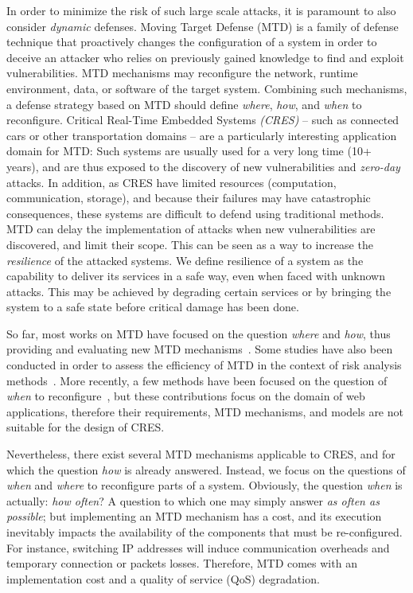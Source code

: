 In order to minimize the risk of such large scale attacks, it is paramount to also consider \emph{dynamic} defenses. Moving Target Defense (MTD) is a family of defense technique that proactively changes the configuration of a system in order to deceive an attacker who relies on previously gained knowledge to find and exploit vulnerabilities. MTD mechanisms may reconfigure the network, runtime environment, data, or software of the target system. Combining such mechanisms, a defense strategy based on MTD should define \emph{where}, \emph{how}, and \emph{when} to reconfigure. Critical Real-Time Embedded Systems \emph{(CRES)} -- such as connected cars or other transportation domains -- are a particularly interesting application domain for MTD: Such systems are usually used for a very long time (10+ years), and are thus exposed to the discovery of new vulnerabilities and \emph{zero-day} attacks. In addition, as CRES have limited resources (computation, communication, storage), and because their failures may have catastrophic consequences, these systems are difficult to defend using traditional methods. MTD can delay the implementation of attacks when new vulnerabilities are discovered, and limit their scope. This can be seen as a way to increase the \emph{resilience} of the attacked systems. We define resilience of a system as the capability to deliver its services in a safe way, even when faced with unknown attacks. This may be achieved by degrading certain services or by bringing the system to a safe state before critical damage has been done.   

So far, most works on MTD have focused on the question \emph{where} and \emph{how}, thus providing and evaluating new MTD mechanisms~\cite{xu_2014, taylor_automated_2016}.
Some studies have also been conducted in order to assess the efficiency of MTD in the context of risk analysis methods~\cite{hong_assessing_2016}. More recently, a few methods have been focused on the question of \emph{when} to reconfigure~\cite{lei_optimal_2017,sengupta_game_2017, feng_stackelberg_2017, li_optimal_2019, Zhang_Strat_2019}, but these contributions focus on the domain of web applications, therefore their requirements, MTD mechanisms, and models are not suitable for the design of CRES. 

Nevertheless, there exist several MTD mechanisms applicable to CRES, and for which the question \emph{how} is already answered. Instead, we focus on the questions of \emph{when} and \emph{where} to reconfigure parts of a system. 
Obviously, the question \emph{when} is actually: \emph{how often}? A question to which one may simply answer \emph{as often as possible}; but implementing an MTD mechanism has a cost, and its execution inevitably impacts the availability of the components that must be re-configured. For instance, switching IP addresses will induce communication overheads and temporary connection or packets losses. Therefore, MTD comes with an implementation cost and a quality of service (QoS) degradation.

